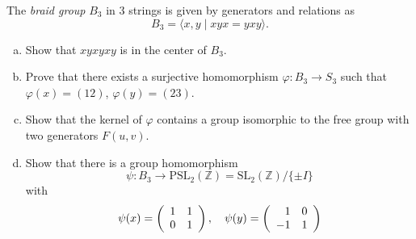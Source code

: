 \documentclass{article}
\newcounter{Problem}
\newenvironment{Problem}{\begin{Exercise}[name={Problem},
                                          counter={Problem}]}
                        {\end{Exercise}}
\begin{document}
\begin{Problem}
The \emph{braid group} $B_3$ in 3 strings is given by generators and
relations as
$$
B_3 = \langle x, y \mid xyx = yxy \rangle.
$$

\begin{enumerate}[(a)]
  \item{
    Show that $xyxyxy$ is in the center of $B_3$.
  }
  \item{
    Prove that there exists a surjective homomorphism
    $\varphi : B_3 \to S_3$ such that $\varphi(x) = (12)$,
    $\varphi(y) = (23)$.
  }
  \item{
    Show that the kernel of $\varphi$ contains a group isomorphic to
    the free group with two generators $F(u,v)$.
  }
  \item{
    Show that there is a group homomorphism
    $$
    \psi : B_3
       \to \mathrm{PSL}_2(\mathbb{Z})
         = \mathrm{SL}_2(\mathbb{Z}) / \{ \pm I \}
    $$
    with
    $$
    \psi(x) =
    \left(\begin{array}{r r}
      1 & 1 \\
      0 & 1
    \end{array}\right), \quad
    \psi(y) =
    \left(\begin{array}{r r}
      1 & 0 \\
     -1 & 1
    \end{array}\right)
    $$
  }
\end{enumerate}
\end{Problem}
\end{document}
